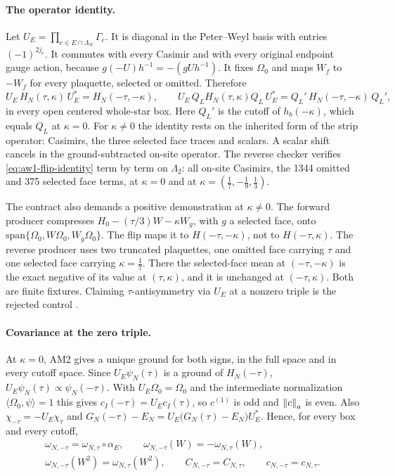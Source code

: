 \paragraph{The operator identity.}
Let $U_E=\prod_{e\in E\cap\Lambda_N}\Gamma_e$. It is diagonal in the
Peter--Weyl basis with entries $(-1)^{2j_e}$. It commutes with every Casimir
and with every original endpoint gauge action, because $g(-U)h^{-1}=-(gUh^{-1})$.
It fixes $\Omega_0$ and maps $W_f$ to $-W_f$ for every plaquette, selected or
omitted. Therefore
\begin{equation}
 U_E\,H_N(\tau,\kappa)\,U_E^*=H_N(-\tau,-\kappa),\qquad
 U_E\,Q_LH_N(\tau,\kappa)Q_L\,U_E^*=Q_L'\,H_N(-\tau,-\kappa)\,Q_L' ,
 \label{eq:aw1-flip-identity}
\end{equation}
in every open centered whole-star box. Here $Q_L'$ is the cutoff of
$h_b(-\kappa)$, which equals $Q_L$ at $\kappa=0$. For $\kappa\ne0$ the
identity rests on the inherited form of the strip operator: Casimirs, the
three selected face traces and scalars. A scalar shift cancels in the
ground-subtracted on-site operator. The reverse checker verifies
\eqref{eq:aw1-flip-identity} term by term on $\Lambda_2$: all on-site
Casimirs, the 1344 omitted and 375 selected face terms, at $\kappa=0$ and at
$\kappa=(\tfrac17,-\tfrac19,\tfrac13)$.

The contract also demands a positive demonstration at $\kappa\ne0$. The
forward producer compresses $H_0-(\tau/3)W-\kappa W_g$, with $g$ a selected
face, onto $\mathrm{span}\{\Omega_0,W\Omega_0,W_g\Omega_0\}$. The flip maps it
to $H(-\tau,-\kappa)$, not to $H(-\tau,\kappa)$. The reverse producer uses
two truncated plaquettes, one omitted face carrying $\tau$ and one selected
face carrying $\kappa=\tfrac17$. There the selected-face mean at
$(-\tau,-\kappa)$ is the exact negative of its value at $(\tau,\kappa)$, and
it is unchanged at $(-\tau,\kappa)$. Both are finite fixtures. Claiming
$\tau$-antisymmetry via $U_E$ at a nonzero triple is the rejected control
.

\paragraph{Covariance at the zero triple.}
At $\kappa=0$, AM2 gives a unique ground for both signs, in the full space and
in every cutoff space. Since $U_E\psi_N(\tau)$ is a ground of $H_N(-\tau)$,
$U_E\psi_N(\tau)\propto\psi_N(-\tau)$. With $U_E\Omega_0=\Omega_0$ and the
intermediate normalization $\langle\Omega_0,\psi\rangle=1$ this gives
$c_I(-\tau)=U_Ec_I(\tau)$, so $c^{(1)}$ is odd and $\left\lVert c\right\rVert_a$ is even. Also
$\chi_{-\tau}=-U_E\chi_\tau$ and
$G_N(-\tau)-E_N=U_E\bigl(G_N(\tau)-E_N\bigr)U_E^*$. Hence, for every box and
every cutoff,
\begin{equation}
 \begin{gathered}
 \omega_{N,-\tau}=\omega_{N,\tau}\circ\alpha_E,\qquad
 \omega_{N,-\tau}(W)=-\omega_{N,\tau}(W),\\
 \omega_{N,-\tau}(W^2)=\omega_{N,\tau}(W^2),\qquad
 C_{N,-\tau}=C_{N,\tau},\qquad c_{N,-\tau}=c_{N,\tau}.
 \end{gathered}
 \label{eq:aw1-covariance}
\end{equation}


